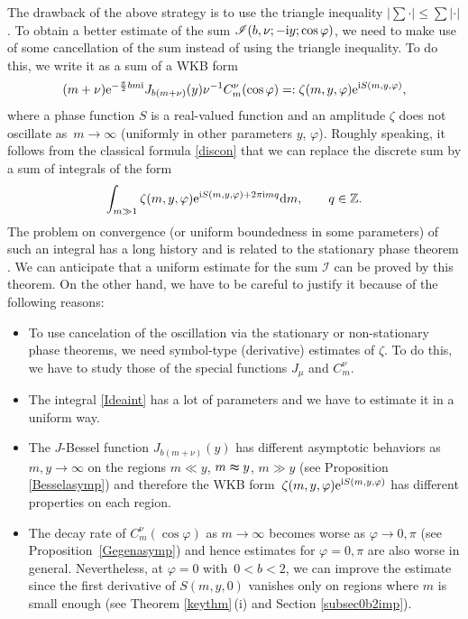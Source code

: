 \documentclass[pdftex]{sigma}
\numberwithin{equation}{section}
\def\f{\varphi}
\def\m{\mu}
\def\n{\nu}
\def\z{\zeta}
\newcommand{\sI}{\mathscr{I}}
\begin{document}
The drawback of the above strategy is to use the triangle inequality $|\sum \cdot|\leq \sum|\cdot|$.
To obtain a better estimate of the sum $\sI(b,\nu;-{\rm i}y;\cos\f)$, we need to make use of some cancellation of the sum instead of using the triangle inequality.
To do this, we write it as a sum of a WKB form
\begin{align*}
(m+\nu){\rm e}^{-\frac{\pi}{2}bm{\rm i}}J_{b(m+\n)}(y)\n^{-1}C^{\nu}_m(\cos\f)=:\z(m,y,\f){\rm e}^{{\rm i}S(m,y,\f)},
\end{align*}
where a phase function $S$ is a real-valued function and an amplitude $\z$ does not oscillate as~${m\to \infty}$ (uniformly in other parameters $y$, $\f$). Roughly speaking, it follows from the classical formula \eqref{discon} that we can replace the discrete sum by a sum of integrals of the form
\begin{align}\label{Ideaint}
\int_{m\gg 1}\z(m,y,\f){\rm e}^{{\rm i}S(m,y,\f)+2\pi {\rm i} mq} {\rm d}m,\qquad q\in\mathbb{Z}.
\end{align}
The problem on convergence (or uniform boundedness in some parameters) of such an integral has a long history and is related to the stationary phase theorem \cite{S}. We can anticipate that a uniform estimate for the sum $\sI$ can be proved by this theorem. On the other hand, we have to be careful to justify it because of the following reasons:
\begin{itemize}\itemsep=0pt
\item To use cancelation of the oscillation via the stationary or non-stationary phase theorems, we need symbol-type (derivative) estimates of $\z$. To do this, we have to study those of the special functions $J_{\m}$ and $C_{m}^{\n}$.

\item The integral \eqref{Ideaint} has a lot of parameters and we have to estimate it in a uniform way.

\item The $J$-Bessel function $J_{b(m+\n)}(y)$ has different asymptotic behaviors as $m,y\to \infty$ on the regions $m\ll y$, $m\thickapprox y$, $m\gg y$ (see Proposition \ref{Besselasymp}) and therefore the WKB form~${\z(m,y,\f){\rm e}^{{\rm i}S(m,y,\f)}}$ has different properties on each region.

\item The decay rate of $C^{\nu}_m(\cos\f)$ as $m\to \infty$ becomes worse as $\f\to 0,\pi$ (see Proposition~\ref{Gegenasymp}) and hence estimates for $\f=0,\pi$ are also worse in general. Nevertheless, at $\f=0$ with~${0<b<2}$, we can improve the estimate since the first derivative of $S(m,y,0)$ vanishes only on regions where $m$ is small enough (see Theorem \ref{keythm}\,(i) and Section \ref{subsec0b2imp}).
\end{itemize}
\end{document}
